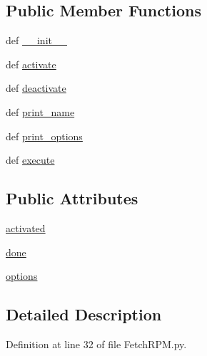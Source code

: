 \subsection*{Public Member Functions}
\begin{DoxyCompactItemize}
\item 
def \hyperlink{class_fetch_r_p_m_1_1_fetch_r_p_m_af57a8837250b7782f1b90b2b470193f9}{\-\_\-\-\_\-init\-\_\-\-\_\-}
\item 
def \hyperlink{class_fetch_r_p_m_1_1_fetch_r_p_m_ab8f2446c87e3ea93fd1772eaeb41c1ef}{activate}
\item 
def \hyperlink{class_fetch_r_p_m_1_1_fetch_r_p_m_a7c6c61c0a54efc05bad197921bd8c5b6}{deactivate}
\item 
def \hyperlink{class_fetch_r_p_m_1_1_fetch_r_p_m_a664e74f6ffa5b35fe091774cd9f1bfc1}{print\-\_\-name}
\item 
def \hyperlink{class_fetch_r_p_m_1_1_fetch_r_p_m_aa39b706480033877a1d419f7c290be4b}{print\-\_\-options}
\item 
def \hyperlink{class_fetch_r_p_m_1_1_fetch_r_p_m_af53a30fe8dbccf8e680d03b522e9b65b}{execute}
\end{DoxyCompactItemize}
\subsection*{Public Attributes}
\begin{DoxyCompactItemize}
\item 
\hyperlink{class_fetch_r_p_m_1_1_fetch_r_p_m_a9f6cabfb9636d52b2d183f4e94719b01}{activated}
\item 
\hyperlink{class_fetch_r_p_m_1_1_fetch_r_p_m_a3748f8f056ba42647c310c4214b54e1f}{done}
\item 
\hyperlink{class_fetch_r_p_m_1_1_fetch_r_p_m_a39376323f8fd2895b9f9beaeded740be}{options}
\end{DoxyCompactItemize}


\subsection{Detailed Description}


Definition at line 32 of file Fetch\-R\-P\-M.\-py.



